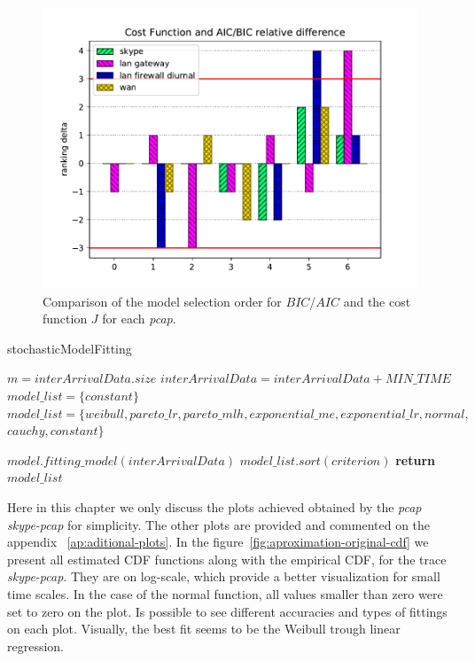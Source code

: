 \begin{figure}[ht!]
\includegraphics[scale=1]{figures/ch4/aicbic-costfunction-relative-diff}
\caption{Comparison of the model selection order for $BIC$/$AIC$ and the cost function $J$ for each \textit{pcap}.}
\label{fig:cost-function_vs_aic-bic}
\end{figure}



\begin{algorithm}[ht!]
    \caption{stochasticModelFitting}
    \label{alg:stochasticModelFitting}
    \begin{algorithmic}[1]
        \small        {}
        \State $m = interArrivalData.size$
        \State $interArrivalData = interArrivalData + MIN\_TIME$
        \State $model\_list = \{constant\}$
        \Else
        \State $model\_list = \{weibull, pareto\_lr, pareto\_mlh, exponential\_me, exponential\_lr, normal,$
        \State $cauchy, constant\}$
        \EndIf
        
        \State $model.fitting\_model(interArrivalData)$
        \EndFor
        \State $model\_list.sort(criterion)$
        \State \textbf{return} $model\_list$
        \EndFunction
    \end{algorithmic}
\end{algorithm}

Here in this chapter we only discuss the plots achieved obtained by the \textit{pcap} \textit{skype-pcap} for simplicity. The other plots are provided and commented on the appendix ~\ref{ap:aditional-plots}. In the figure~\ref{fig:aproximation-original-cdf} we present all estimated CDF functions along with the empirical CDF, for the trace \textit{skype-pcap}. They are on log-scale, which provide a better visualization for small time scales. In the case of the normal function, all values smaller than zero were set to zero on the plot. Is possible to see different accuracies and types of fittings on each plot. Visually, the best fit seems to be the Weibull trough linear regression. 

